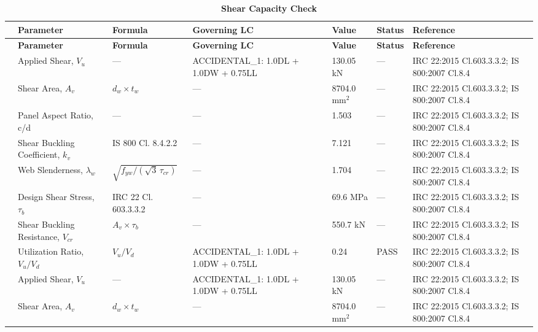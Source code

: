 \documentclass[12pt,a4paper]{report}
\numberwithin{table}{chapter}
\numberwithin{figure}{chapter}
\begin{document}
\vspace{1em}
\begin{longtable}{|C{1.3cm}|C{2.5cm}|C{2.3cm}|>{\centering\arraybackslash}p{3.0cm}|C{2.4cm}|C{1.4cm}|C{2.4cm}|}
\caption{\textbf{Shear Capacity Check}}
\hline
\textbf{} & \textbf{Parameter} & \textbf{Formula} & \textbf{Governing LC} & \textbf{Value} & \textbf{Status} & \textbf{Reference} \\[6pt]
\hline
\endfirsthead

\hline
\textbf{} & \textbf{Parameter} & \textbf{Formula} & \textbf{Governing LC} & \textbf{Value} & \textbf{Status} & \textbf{Reference} \\[6pt]
\hline
\endhead
{} & Applied Shear, $V_u$ & --- & ACCIDENTAL\_\allowbreak{}1:\allowbreak{} 1.0DL + 1.0DW + 0.75LL & 130.05 kN & --- & IRC 22:2015 Cl.603.3.3.2; IS 800:2007 Cl.8.4 \\[6pt]
 & Shear Area, $A_v$ & $d_w \times t_w$ & --- & 8704.0 mm$^2$ & --- & IRC 22:2015 Cl.603.3.3.2; IS 800:2007 Cl.8.4 \\[6pt]
 & Panel Aspect Ratio, c/d & --- & --- & 1.503 & --- & IRC 22:2015 Cl.603.3.3.2; IS 800:2007 Cl.8.4 \\[6pt]
 & Shear Buckling Coefficient, $k_v$ & IS 800 Cl. 8.4.2.2 & --- & 7.121 & --- & IRC 22:2015 Cl.603.3.3.2; IS 800:2007 Cl.8.4 \\[6pt]
 & Web Slenderness, $\lambda_w$ & $\sqrt{f_{yw}/(\sqrt{3}\,\tau_{cr})}$ & --- & 1.704 & --- & IRC 22:2015 Cl.603.3.3.2; IS 800:2007 Cl.8.4 \\[6pt]
 & Design Shear Stress, $\tau_b$ & IRC 22 Cl. 603.3.3.2 & --- & 69.6 MPa & --- & IRC 22:2015 Cl.603.3.3.2; IS 800:2007 Cl.8.4 \\[6pt]
 & Shear Buckling Resistance, $V_{cr}$ & $A_v \times \tau_b$ & --- & 550.7 kN & --- & IRC 22:2015 Cl.603.3.3.2; IS 800:2007 Cl.8.4 \\[6pt]
 & Utilization Ratio, $V_u / V_d$ & $V_u / V_d$ & ACCIDENTAL\_\allowbreak{}1:\allowbreak{} 1.0DL + 1.0DW + 0.75LL & 0.24 & PASS & IRC 22:2015 Cl.603.3.3.2; IS 800:2007 Cl.8.4 \\[6pt]
\hline
{} & Applied Shear, $V_u$ & --- & ACCIDENTAL\_\allowbreak{}1:\allowbreak{} 1.0DL + 1.0DW + 0.75LL & 130.05 kN & --- & IRC 22:2015 Cl.603.3.3.2; IS 800:2007 Cl.8.4 \\[6pt]
 & Shear Area, $A_v$ & $d_w \times t_w$ & --- & 8704.0 mm$^2$ & --- & IRC 22:2015 Cl.603.3.3.2; IS 800:2007 Cl.8.4 \\[6pt]

\end{longtable}
\end{document}
